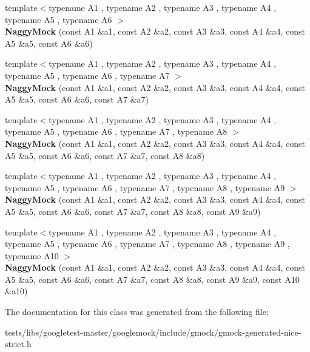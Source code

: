 \begin{DoxyCompactItemize}
\item 
\mbox{\label{classtesting_1_1NaggyMock_aac4c0986e917a5d6e515f8dc0e7bf644}} 
{\footnotesize template$<$typename A1 , typename A2 , typename A3 , typename A4 , typename A5 , typename A6 $>$ }\\{\bfseries Naggy\+Mock} (const A1 \&a1, const A2 \&a2, const A3 \&a3, const A4 \&a4, const A5 \&a5, const A6 \&a6)
\item 
\mbox{\label{classtesting_1_1NaggyMock_ad1edac1991dd20514e822c90d6896c74}} 
{\footnotesize template$<$typename A1 , typename A2 , typename A3 , typename A4 , typename A5 , typename A6 , typename A7 $>$ }\\{\bfseries Naggy\+Mock} (const A1 \&a1, const A2 \&a2, const A3 \&a3, const A4 \&a4, const A5 \&a5, const A6 \&a6, const A7 \&a7)
\item 
\mbox{\label{classtesting_1_1NaggyMock_a63b30506f56b792ffbdc5792a9630d5e}} 
{\footnotesize template$<$typename A1 , typename A2 , typename A3 , typename A4 , typename A5 , typename A6 , typename A7 , typename A8 $>$ }\\{\bfseries Naggy\+Mock} (const A1 \&a1, const A2 \&a2, const A3 \&a3, const A4 \&a4, const A5 \&a5, const A6 \&a6, const A7 \&a7, const A8 \&a8)
\item 
\mbox{\label{classtesting_1_1NaggyMock_a786f31ade7b8b9f6e78e07f51cc0e14b}} 
{\footnotesize template$<$typename A1 , typename A2 , typename A3 , typename A4 , typename A5 , typename A6 , typename A7 , typename A8 , typename A9 $>$ }\\{\bfseries Naggy\+Mock} (const A1 \&a1, const A2 \&a2, const A3 \&a3, const A4 \&a4, const A5 \&a5, const A6 \&a6, const A7 \&a7, const A8 \&a8, const A9 \&a9)
\item 
\mbox{\label{classtesting_1_1NaggyMock_aa40a39806b939f423696f9380de3172b}} 
{\footnotesize template$<$typename A1 , typename A2 , typename A3 , typename A4 , typename A5 , typename A6 , typename A7 , typename A8 , typename A9 , typename A10 $>$ }\\{\bfseries Naggy\+Mock} (const A1 \&a1, const A2 \&a2, const A3 \&a3, const A4 \&a4, const A5 \&a5, const A6 \&a6, const A7 \&a7, const A8 \&a8, const A9 \&a9, const A10 \&a10)
\end{DoxyCompactItemize}


The documentation for this class was generated from the following file\+:\begin{DoxyCompactItemize}
\item 
tests/libs/googletest-\/master/googlemock/include/gmock/gmock-\/generated-\/nice-\/strict.\+h\end{DoxyCompactItemize}
